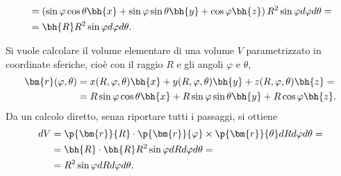 \begin{remark}
\begin{example}
\begin{equation}
\begin{aligned}
 & = \left( \sin \varphi \cos \theta \bh{x} + \sin \varphi \sin \theta \bh{y} + \cos \varphi \bh{z} \right) R^2 \sin \varphi d \varphi d \theta = \\
 & = \bh{R} R^2 \sin \varphi d \varphi d \theta .
\end{aligned}
\end{equation}
\end{example}
\begin{example}\label{exa:cyl:vol}
Si vuole calcolare il volume elementare di una volume $V$ parametrizzato in coordinate sferiche, cioè con il raggio $R$ e gli angoli $\varphi$ e $\theta$,
\begin{equation}
\begin{aligned}
 \bm{r}(\varphi,\theta) & = 
 x(R,\varphi,\theta) \bh{x} + y(R,\varphi,\theta) \bh{y} + z(R,\varphi,\theta) \bh{z} = \\
& = R \sin \varphi \cos \theta \bh{x} +
    R \sin \varphi \sin \theta \bh{y} +
    R \cos \varphi \bh{z} .
\end{aligned}
\end{equation}
Da un calcolo diretto, senza riportare tutti i passaggi, si ottiene
\begin{equation}
\begin{aligned}
 dV & = \p{\bm{r}}{R} \cdot \p{\bm{r}}{\varphi} \times \p{\bm{r}}{\theta} dR d\varphi d\theta = \\
  & = \bh{R} \cdot \bh{R} R^2 \sin \varphi dR d \varphi d \theta = \\
  & = R^2 \sin \varphi dR d \varphi d \theta .
\end{aligned}
\end{equation}
\end{example}


\end{remark}
